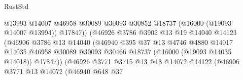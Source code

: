 \begin{lexlean}{RustStd}
\begin{coremodule}
                                              @13993
                                              @14007
                                              @46958
                                              @30089
                                              @30093
                                              @30852
                                              @18737
                                              (@16000 (@19093 @14007 @13994))
                                              @17847))
                                          (@46926
                                            @3786
                                            @3902
                                            @13
                                            @19
                                            @14040
                                            @14123
                                            (@46906
                                              @3786
                                              @13
                                              @14040
                                              (@46940
                                                @395
                                                @37
                                                @13
                                                @4746
                                                @4880
                                                @14017
                                                @14035
                                                @46958
                                                @30089
                                                @30093
                                                @30466
                                                @18737
                                                (@16000 (@19093 @14035 @14018))
                                                @17847))
                                            (@46926
                                              @3771
                                              @3715
                                              @13
                                              @18
                                              @14072
                                              @14122
                                              (@46906
                                                @3771
                                                @13
                                                @14072
                                                (@46940
                                                  @648
                                                  @37

\end{coremodule}
\end{lexlean}
